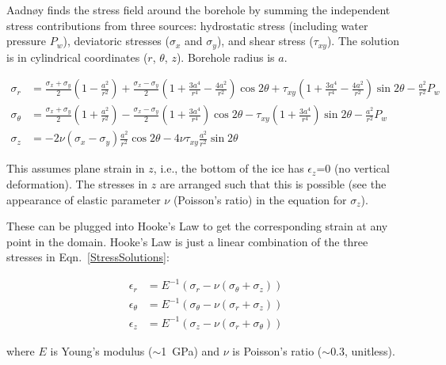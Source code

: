 \documentclass[11pt]{article}
\begin{document}
Aadn\o{}y finds the stress field around the borehole by summing the independent stress contributions from three sources: hydrostatic stress (including water pressure $P_w$), deviatoric stresses ($\sigma_x$ and $\sigma_y$), and shear stress ($\tau_{xy}$).  The solution is in cylindrical coordinates ($r$, $\theta$, $z$).  Borehole radius is $a$.  

\begin{equation}
	\begin{aligned}
	\sigma_r &= \frac{\sigma_x+\sigma_y}{2}\left(1-\frac{a^2}{r^2}\right) + \frac{\sigma_x-\sigma_y}{2}\left(1+\frac{3a^4}{r^4}-\frac{4a^2}{r^2}\right) \cos2\theta + \tau_{xy}\left(1+\frac{3a^4}{r^4}-\frac{4a^2}{r^2}\right)\sin2\theta - \frac{a^2}{r^2}P_w \\
	\sigma_\theta &= \frac{\sigma_x+\sigma_y}{2}\left(1+\frac{a^2}{r^2}\right) - \frac{\sigma_x-\sigma_y}{2}\left(1+\frac{3a^4}{r^4}\right) \cos2\theta - \tau_{xy}\left(1+\frac{3a^4}{r^4}\right)\sin2\theta - \frac{a^2}{r^2}P_w \\
	\sigma_z &= -2\nu\left(\sigma_x-\sigma_y\right)\frac{a^2}{r^2}\cos2\theta - 4\nu\tau_{xy}\frac{a^2}{r^2}\sin2\theta
	\end{aligned}
\label{StressSolutions}
\end{equation}

\noindent This assumes plane strain in $z$, i.e., the bottom of the ice has $\epsilon_z$=0 (no vertical deformation).  The stresses in $z$ are arranged such that this is possible (see the appearance of elastic parameter $\nu$ (Poisson's ratio) in the equation for $\sigma_z$).

These can be plugged into Hooke's Law to get the corresponding strain at any point in the domain.  Hooke's Law is just a linear combination of the three stresses in Eqn.~\ref{StressSolutions}:

\begin{equation}
	\begin{aligned}
	\epsilon_r &= E^{-1}\left(\sigma_r - \nu \left(\sigma_\theta + \sigma_z \right)\right) \\
	\epsilon_\theta &= E^{-1}\left(\sigma_\theta - \nu \left(\sigma_r + \sigma_z \right)\right) \\
	\epsilon_z &= E^{-1}\left(\sigma_z - \nu \left(\sigma_r + \sigma_\theta \right)\right)
	\end{aligned}
\label{Hooke}
\end{equation}

\noindent where $E$ is Young's modulus ($\sim$1~GPa) and $\nu$ is Poisson's ratio ($\sim$0.3, unitless).
\end{document}
